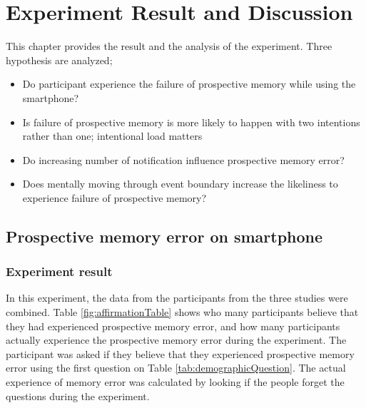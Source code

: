 \chapter{Experiment Result and Discussion}

This chapter provides the result and the analysis of the experiment. Three hypothesis are analyzed;
\begin{itemize}
  \item{Do participant experience the failure of prospective memory while using the smartphone?}
  \item{Is failure of prospective memory is more likely to happen with two intentions rather than one; intentional load matters}
  \item{Do increasing number of notification influence prospective memory error?}
  \item{Does mentally moving through event boundary increase the likeliness to experience failure of prospective memory?}
\end{itemize}

\section{Prospective memory error on smartphone}

\subsection{Experiment result}
In this experiment, the data from the participants from the three studies were combined.
Table \ref{fig:affirmationTable} shows who many participants believe that they had experienced prospective memory error,
and how many participants actually experience the prospective memory error during the experiment.
The participant was asked if they believe that they experienced prospective memory error using the first question on Table \ref{tab:demographicQuestion}.
The actual experience of memory error was calculated by looking if the people forget the questions during the experiment.


